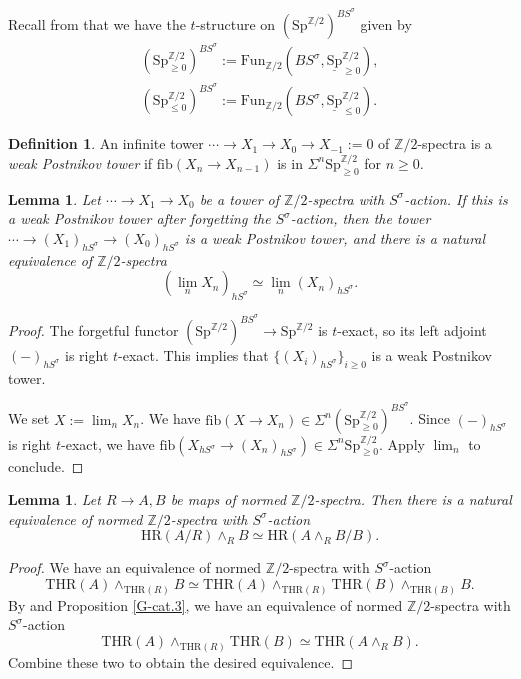 \documentclass[10pt]{amsart}
\newtheorem{lem}[thm]{Lemma}
\theoremstyle{definition}
\newtheorem{df}[thm]{Definition}
\numberwithin{equation}{section}
\newcommand{\Z}{\mathbb{Z}}
\newcommand{\ul}{\underline}
\newcommand{\Fun}{\mathrm{Fun}}
\newcommand{\Sp}{\mathrm{Sp}}
\newcommand{\fib}{\mathrm{fib}}
\newcommand{\HR}{\mathrm{HR}}
\newcommand{\THR}{\mathrm{THR}}
\begin{document}
{Recall from \cite[Remark 3.13]{QS22} that we have the $t$-structure on $(\Sp^{\Z/2})^{BS^\sigma}$ given by
\begin{gather*}
(\Sp^{\Z/2}_{\geq 0})^{BS^\sigma}
:=
\Fun_{\Z/2}(B S^\sigma,\ul{\Sp}^{\Z/2}_{\geq 0}),
\\
(\Sp^{\Z/2}_{\leq 0})^{BS^\sigma}
:=
\Fun_{\Z/2}(B S^\sigma,\ul{\Sp}^{\Z/2}_{\leq 0}).
\end{gather*}

\begin{df}
\label{TPR.1}
An infinite tower $\cdots \to X_1\to X_0\to X_{-1}:=0$ of $\Z/2$-spectra is a \emph{weak Postnikov tower} if $\fib(X_n\to X_{n-1})$ is in $\Sigma^n \Sp_{\geq 0}^{\Z/2}$ for $n\geq 0$.
\end{df}



\begin{lem}
\label{TPR.2}
Let $\cdots \to X_1\to X_0$ be a tower of $\Z/2$-spectra with $S^\sigma$-action.
If this is a weak Postnikov tower after forgetting the $S^\sigma$-action,
then the tower $\cdots \to (X_1)_{h S^\sigma}\to (X_0)_{h S^\sigma}$ is a weak Postnikov tower,
and there is a natural equivalence of $\Z/2$-spectra
\[
(\lim_n X_n)_{h S^\sigma}
\simeq
\lim_n (X_n)_{h S^\sigma}.
\]
\end{lem}
\begin{proof}
The forgetful functor $(\Sp^{\Z/2})^{BS^\sigma}\to \Sp^{\Z/2}$ is $t$-exact,
so its left adjoint $(-)_{hS^\sigma}$ is right $t$-exact.
This implies that $\{(X_i)_{h S^\sigma}\}_{i\geq 0}$ is a weak Postnikov tower.

We set $X:=\lim_n X_n$.
We have $\fib(X\to X_n)\in \Sigma^n (\Sp_{\geq 0}^{\Z/2})^{BS^\sigma}$.
Since $(-)_{hS^\sigma}$ is right $t$-exact,
we have $\fib(X_{hS^\sigma}\to (X_n)_{h S^\sigma})\in \Sigma^n \Sp_{\geq 0}^{\Z/2}$.
Apply $\lim_n$ to conclude.
\end{proof}




\begin{lem}
\label{descent.2}
Let $R\to A,B$ be maps of normed $\Z/2$-spectra.
Then there is a natural equivalence of normed $\Z/2$-spectra with $S^\sigma$-action
\[
\HR(A/R)\wedge_{R} B
\simeq
\HR(A\wedge_R B/B).
\]
\end{lem}
\begin{proof}
We have an equivalence of normed $\Z/2$-spectra with $S^\sigma$-action
\[
\THR(A)\wedge_{\THR(R)}B
\simeq
\THR(A)\wedge_{\THR(R)}\THR(B)\wedge_{\THR(B)}B.
\]
By \cite[Proposition 2.1.5]{HP23} and Proposition \ref{G-cat.3},
we have an equivalence of normed $\Z/2$-spectra with $S^\sigma$-action
\[
\THR(A)\wedge_{\THR(R)}\THR(B)
\simeq
\THR(A\wedge_R B).
\]
Combine these two to obtain the desired equivalence.
\end{proof}

}
\end{document}
